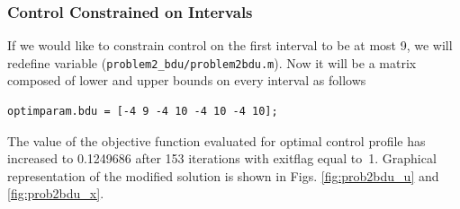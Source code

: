 \subsubsection{Control Constrained on Intervals}
If we would like to constrain control on the first interval to be at
most 9, we will redefine variable 
(\verb+problem2_bdu/problem2bdu.m+).  Now it will be a matrix composed
of lower and upper bounds on every interval as follows
\begin{verbatim}
optimparam.bdu = [-4 9 -4 10 -4 10 -4 10]; 
\end{verbatim}

The value of the objective function evaluated for optimal control
profile has increased to 0.1249686 after 153 iterations with exitflag
equal to~1. Graphical representation of the modified solution is shown in Figs. \ref{fig:prob2bdu_u} and
\ref{fig:prob2bdu_x}.

